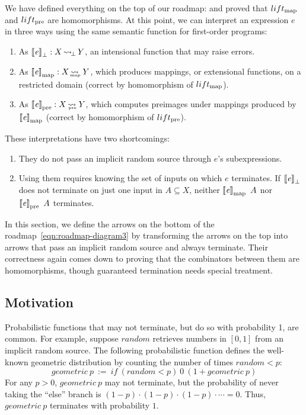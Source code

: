 We have defined everything on the top of our roadmap:
and proved that $lift_\mathrm{map}$ and $lift_\mathrm{pre}$ are homomorphisms.
At this point, we can interpret an expression $\mathit{e}$ in three ways using the same semantic function for first-order programs:
\begin{enumerate}
	\item As $\left\llbracket{\mathit{e}}\right\rrbracket_\bot : X \operatorname{\rightsquigarrow_{\mspace{-3mu}\bot}} Y$, an intensional function that may raise errors.
	\item As $\left\llbracket{\mathit{e}}\right\rrbracket_\mathrm{map} : X \operatorname{\rightsquigarrow_{\mspace{-23mu}_\mathrm{map}}} Y$, which produces mappings, or extensional functions, on a restricted domain (correct by homomorphism of $lift_\mathrm{map}$).
	\item As $\left\llbracket{\mathit{e}}\right\rrbracket_\mathrm{pre} : X \operatorname{\rightsquigarrow_{\mspace{-20mu}_\mathrm{pre}}} Y$, which computes preimages under mappings produced by $\left\llbracket{\mathit{e}}\right\rrbracket_\mathrm{map}$ (correct by homomorphism of $lift_\mathrm{pre}$).
\end{enumerate}
These interpretations have two shortcomings:
\begin{enumerate}
	\item They do not pass an implicit random source through $\mathit{e}$'s subexpressions.
	\item Using them requires knowing the set of inputs on which $\mathit{e}$ terminates. If $\left\llbracket{\mathit{e}}\right\rrbracket_\bot$ does not terminate on just one input in $A \subseteq X$, neither $\left\llbracket{\mathit{e}}\right\rrbracket_\mathrm{map}~A$ nor $\left\llbracket{\mathit{e}}\right\rrbracket_\mathrm{pre}~A$ terminates.
\end{enumerate}
In this section, we define the arrows on the bottom of the roadmap~\eqref{eqn:roadmap-diagram3} by transforming the arrows on the top into arrows that pass an implicit random source and always terminate.
Their correctness again comes down to proving that the combinators between them are homomorphisms, though guaranteed termination needs special treatment.

\subsection{Motivation}

Probabilistic functions that may not terminate, but do so with probability 1, are common.
For example, suppose $random$ retrieves numbers in $[0,1]$ from an implicit random source.
The following probabilistic function defines the well-known geometric distribution by counting the number of times $random < p$:
\begin{equation}
	geometric~p \ := \ if~(random < p)~0~(1 + geometric~p)
\label{eqn:geometric-def}
\end{equation}
For any $p > 0$, $geometric~p$ may not terminate, but the probability of never taking the ``else'' branch is $(1-p) \cdot (1-p) \cdot (1-p) \cdot \cdots = 0$. Thus, $geometric~p$ terminates with probability $1$.

